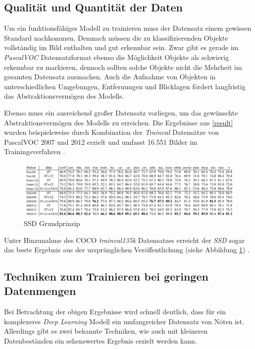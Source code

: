 \subsection*{Qualität und Quantität der Daten}

Um ein funktionsfähiges Modell zu trainieren muss der Datensatz einem gewissen Standard nachkommen. Demnach müssen die zu klassifizierenden Objekte vollständig im Bild enthalten und gut erkennbar sein. Zwar gibt es gerade im \textit{PascalVOC} Datensatzformat ebenso die Möglichkeit Objekte als \glqq schwierig erkennbar\grqq{} zu markieren, dennoch sollten solche Objekte nicht die Mehrheit im gesamten Datensatz ausmachen. Auch die Aufnahme von Objekten in unterschiedlichen Umgebungen, Entfernungen und Blicklagen fördert langfristig das Abstraktionsvermögen des Modells. 

Ebenso muss ein ausreichend großer Datensatz vorliegen, um das gewünschte Abstraktionsvermögen des Modells zu erreichen. Die Ergebnisse aus \ref{result} wurden beispielsweise durch Kombination der \textit{Trainval} Datensätze von PascalVOC 2007 und 2012 erzielt und umfasst 16.551 Bilder im Trainingsverfahren \cite{ssd.20161229} \cite{MarkEveringham.20070607} \cite{MarkEveringham.20120521}. 

\begin{figure}[ht]
	\begin{center}
		\includegraphics[width=15cm]{Bilder/ssd_results_details.png} 
		\caption[SSD Grundprinzip]{SSD Grundprinzip \cite{ssd.20161229}}
		\label{amountofdata}
	\end{center}
\end{figure}

Unter Hinzunahme des COCO \textit{trainval135k} Datensatzes erreicht der \textit{SSD} sogar das beste Ergebnis aus der ursprünglichen Veröffentlichung (siehe Abbildung \ref{amountofdata}) \cite{ssd.20161229}. 

\subsection*{Techniken zum Trainieren bei geringen Datenmengen}

Bei Betrachtung der obigen Ergebnisse wird schnell deutlich, dass für ein komplexeres \textit{Deep Learning} Modell ein umfangreicher Datensatz von Nöten ist. Allerdings gibt es zwei bekannte Techniken, wie auch mit kleineren Datenbeständen ein sehenswertes Ergebnis erzielt werden kann. 

